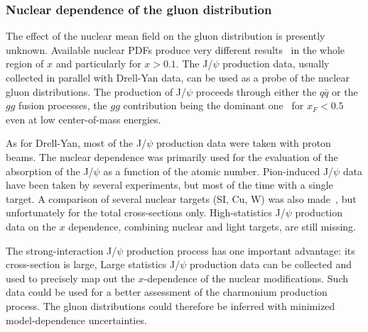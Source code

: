  \subsubsection{Nuclear dependence of the gluon distribution}

The effect of the nuclear mean field on the gluon distribution is presently unknown. Available nuclear PDFs produce 
very different results~\cite{Cazaroto:2008qh} in the whole region of $x$ and particularly for $x > 0.1$.
The J/$\psi$ production data, 
usually collected in parallel with Drell-Yan data, can be used as a probe of the nuclear gluon distributions. 
The production of J/$\psi$ proceeds through either the $q\bar q$ or the $gg$ fusion processes, the $gg$ 
contribution being the dominant one~\cite{Vogt:1999dw} for $x_F < 0.5$  even at low center-of-mass energies. 

As for Drell-Yan, most of the J/$\psi$ production data were taken with proton beams. The nuclear dependence 
was primarily used for the evaluation of the absorption of the J/$\psi$ as a function of the atomic number. 
Pion-induced J/$\psi$ data have been taken by several experiments, but most of the time with a single target. 
A comparison of several nuclear targets (SI, Cu, W) was also made~\cite{Alexandrov:1999ch},  
but unfortunately for the total cross-sections only. High-statistics J/$\psi$ production data on   
the $x$ dependence, combining nuclear and light targets, are still missing. 

The strong-interaction J/$\psi$ production process has one important advantage: its cross-section is large, 
Large statistics J/$\psi$ production data can be collected and 
used to precisely map out the $x$-dependence of the nuclear modifications. Such data could be 
used for a better assessment of the charmonium production process.  The gluon distributions could 
therefore be inferred with minimized model-dependence uncertainties.  

